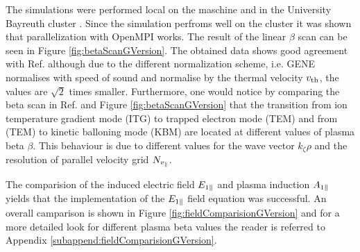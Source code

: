 The simulations were performed local on the maschine  and in the University Bayreuth cluster . Since the simulation perfroms well on the cluster it was shown that parallelization with OpenMPI works. The result of the linear $\beta$ scan can be seen in Figure \ref{fig:betaScanGVersion}. The obtained data shows good agreement with Ref.  although due to the different normalization scheme, i.e. GENE normalises with speed of sound and \gkw normalise by the thermal velocity $v_\mathrm{th}$, the values are $\sqrt{2}$ times smaller. Furthermore, one would notice by comparing the beta scan in Ref.  and Figure \ref{fig:betaScanGVersion} that the transition from ion temperature gradient mode (ITG) to trapped electron mode (TEM) and from (TEM) to kinetic balloning mode (KBM) are located at different values of plasma beta $\beta$. This behaviour is due to different values for the wave vector $k_\zeta \rho$ and the resolution of parallel velocity grid $N_{v_\parallel}$. %


The comparision of the induced electric field $E_{1\parallel}$ and plasma induction $A_{1\parallel}$ yields that the implementation of the $E_{1\parallel}$ field equation was successful. An overall camparison is shown in Figure \ref{fig:fieldComparisionGVersion} and for a more detailed look for different plasma beta values the reader is referred to Appendix \ref{subappend:fieldComparisionGVersion}. 

\newpage



% 


\newpage